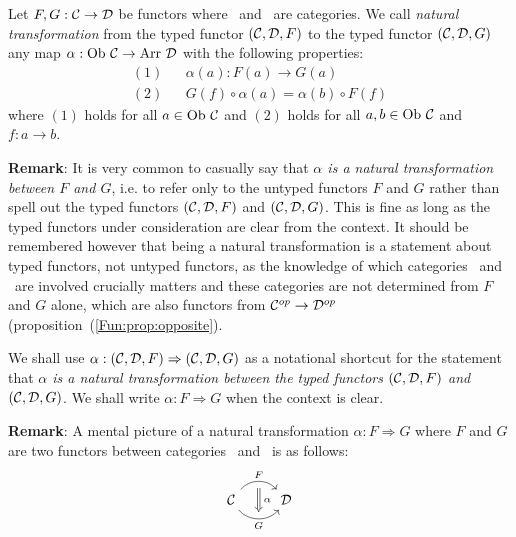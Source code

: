 \begin{defin}\label{Nat:def:natural}
    Let $F,G:\mbox{$\cal C$}\to\mbox{$\cal D$}$ be functors where \Cat\ and \Dat\ are categories.
    We call {\em natural transformation} from the typed functor $(\mbox{$\cal C$},\mbox{$\cal D$},F)$ 
    to the typed functor $(\mbox{$\cal C$},\mbox{$\cal D$},G)$ any map $\alpha : \mbox{\rm Ob}\ \mbox{$\cal C$}\to\mbox{\rm Arr}\ \mbox{$\cal D$}$ 
    with the following properties:
        \begin{eqnarray*}
            (1)& &\alpha(a) : F(a) \to G(a)\\
            (2)& &G(f)\circ\alpha(a) = \alpha(b) \circ F(f)
        \end{eqnarray*}
    where $(1)$ holds for all $a\in\mbox{\rm Ob}\ \mbox{$\cal C$}$ and $(2)$ holds for all 
    $a,b\in\mbox{\rm Ob}\ \mbox{$\cal C$}$ and $f:a\to b$.
\end{defin}

\noindent
{\bf Remark}: It is very common to casually say that {\em $\alpha$ is a natural
transformation between $F$ and $G$}, i.e. to refer only to the untyped functors
$F$ and $G$ rather than spell out the typed functors $(\mbox{$\cal C$},\mbox{$\cal D$},F)$ and
$(\mbox{$\cal C$},\mbox{$\cal D$},G)$. This is fine as long as the typed functors under consideration
are clear from the context. It should be remembered however that being a
natural transformation is a statement about typed functors, not untyped
functors, as the knowledge of which categories \Cat\ and \Dat\ are involved
crucially matters and these categories are not determined from $F$ and $G$
alone, which are also functors from $\mbox{${\cal C}^{op}$}\to\mbox{${\cal D}^{op}$}$ 
(proposition~(\ref{Fun:prop:opposite}).

\begin{notation}\label{Nat:notation:natural:arrow}
    We shall use $\alpha:(\mbox{$\cal C$},\mbox{$\cal D$},F)\Rightarrow (\mbox{$\cal C$},\mbox{$\cal D$},G)$ as a notational 
    shortcut for the statement that {\em $\alpha$ is a natural transformation 
    between the typed functors $(\mbox{$\cal C$},\mbox{$\cal D$},F)$ and $(\mbox{$\cal C$},\mbox{$\cal D$},G)$}. We shall
    write $\alpha:F\Rightarrow G$ when the context is clear.
\end{notation}

\noindent
{\bf Remark}: A mental picture of a natural transformation $\alpha:F\Rightarrow 
G$ where $F$ and $G$ are two functors between categories \Cat\ and \Dat\ is as 
follows:
    \[
        \begin{tikzcd}
            \Cat \arrow[r, "F", bend left  = 50, ""{name=U, below}]
                 \arrow[r, swap, "G", bend right = 50, ""{name=D, above}]
              & \Dat
            \arrow[Rightarrow, "\,\alpha", from = U, to = D]
        \end{tikzcd}
    \]

